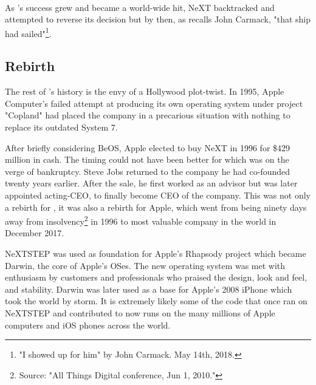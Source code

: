 \\
\par
{}
\par

 As \doom{}'s success grew and became a world-wide hit, NeXT backtracked and attempted to reverse its decision but by then, as recalls John Carmack, "that ship had sailed"\footnote{"I showed up for him" by John Carmack.  May 14th, 2018.}.


\subsection{Rebirth}
The rest of \NeXTns{}'s history is the envy of a Hollywood plot-twist. In 1995, Apple Computer's failed attempt at producing its own operating system under project "Copland" had placed the company in a precarious situation with nothing to replace its outdated System 7.\\
\par
 After briefly considering BeOS, Apple elected to buy NeXT in 1996 for \$429 million in cash. The timing could not have been better for \NeXT which was on the verge of bankruptcy. Steve Jobs returned to the company he had co-founded twenty years earlier. After the sale, he first worked as an advisor but was later appointed acting-CEO, to finally become CEO of the company. This was not only a rebirth for \NeXTns, it was also a rebirth for Apple, which went from being ninety days away from insolvency\footnote{Source: "All Things Digital conference, Jun 1, 2010."} in 1996 to most valuable company in the world in December 2017. \\
\par
NeXTSTEP was used as foundation for Apple's Rhapsody project which became Darwin, the core of Apple's OSes. The new operating system was met with enthusiasm by customers and professionals who praised the design, look and feel, and stability. Darwin was later used as a base for Apple's 2008 iPhone which took the world by storm. It is extremely likely some of the code that once ran on NeXTSTEP and contributed to \doom{} now runs on the many millions of Apple computers and iOS phones across the world.\\



